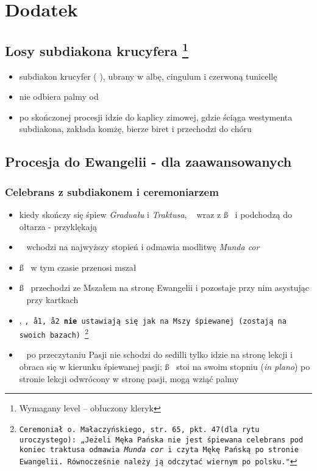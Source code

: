 \section{Dodatek}
\label{sec:dodatek_palm}

\subsection[Losy subdiakona krucyfera]{Losy subdiakona krucyfera \protect \footnote{Wymagany level -- obłuczony kleryk}}
\begin{itemize}
      \item subdiakon krucyfer (  ), ubrany w albę, cingulum i czerwoną
            tunicellę
      \item nie odbiera palmy od \ii
      \item po skończonej procesji idzie do kaplicy zimowej, gdzie ściąga westymenta
            subdiakona, zakłada komżę, bierze biret i przechodzi do chóru
\end{itemize}

\subsection{Procesja do Ewangelii - dla zaawansowanych}

\subsubsection*{\textbf{Celebrans z subdiakonem i ceremoniarzem }}
\begin{itemize}
      \item kiedy skończy się śpiew \textit{Graduału} i \textit{Traktusa}, \ii~ wraz
            z \ss~ i  podchodzą do ołtarza - przyklękają
      \item \ii~ wchodzi na najwyższy stopień i odmawia modlitwę \textit{Munda cor}
      \item \ss~ w tym czasie przenosi mszał
      \item \ss~ przechodzi ze Mszałem na stronę Ewangelii i pozostaje przy nim
            asystując \ii~ przy kartkach
      \item {}, \tt, \aa1, \aa2 \textbf{nie} ustawiają się jak na Mszy
            śpiewanej (zostają na swoich bazach) \footnote{Ceremoniał o.
                  Małaczyńskiego, str. 65, pkt. 47(dla rytu uroczystego): „Jeżeli Męka
                  Pańska nie jest śpiewana celebrans pod koniec traktusa odmawia
                  \textit{Munda cor} i czyta Mękę Pańską po stronie Ewangelii.
                  Równocześnie należy ją odczytać wiernym  po polsku."}
      \item \ii~ po przeczytaniu Pasji nie schodzi do sedilli tylko idzie na
            stronę lekcji i obraca się w kierunku śpiewanej pasji; \ss~ stoi na
            swoim stopniu (\textit{in plano}) po stronie lekcji odwrócony w
            stronę pasji, mogą wziąć palmy
\end{itemize}


